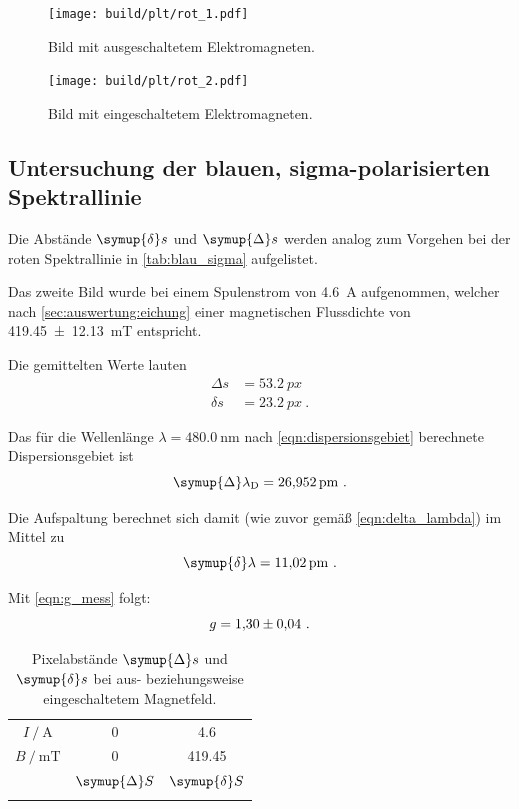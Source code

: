 \begin{figure}
    \centering
    \texttt{[image: build/plt/rot\_1.pdf]}
    \caption{Bild mit ausgeschaltetem Elektromagneten.}
    \label{fig:plt:rot_1}
\end{figure}

\begin{figure}
    \centering
    \texttt{[image: build/plt/rot\_2.pdf]}
    \caption{Bild mit eingeschaltetem Elektromagneten.}
    \label{fig:plt:rot_2}
\end{figure}


\FloatBarrier
\subsection{Untersuchung der blauen, sigma-polarisierten Spektrallinie}
Die Abstände $\symup{\delta} s$ und $\symup{\Delta} s$ werden analog zum Vorgehen bei der roten Spektrallinie
in \autoref{tab:blau_sigma} aufgelistet.

Das zweite Bild wurde bei einem Spulenstrom von \SI{4.6}{\ampere} aufgenommen,
welcher nach \autoref{sec:auswertung:eichung} einer magnetischen Flussdichte von \SI{419.45 \pm 12.13}{\milli\tesla} entspricht.

Die gemittelten Werte lauten
\begin{align*}
    Δs &= \SI{53.2}{px} \\
    δs &= \SI{23.2}{px} \ .
\end{align*}


Das für die Wellenlänge $\lambda = \SI{480.0}{\nano\meter}$ nach \autoref{eqn:dispersionsgebiet} berechnete Dispersionsgebiet ist
\[
    \symup{\Delta}\lambda_\text{D} = \SI{26.952}{\pico\meter} \ .
\]

Die Aufspaltung berechnet sich damit (wie zuvor gemäß \autoref{eqn:delta_lambda}) im Mittel zu
\[
    \symup{\delta} \lambda = \SI{11.02}{\pico\meter} \ .
\]

Mit \autoref{eqn:g_mess} folgt:
\[
    g = \num{1.30 \pm 0.04} \ .
\]

\begin{table}
    \centering
    \caption{Pixelabstände $\symup{\Delta} s$ und $\symup{\delta} s$ bei aus- beziehungsweise eingeschaltetem Magnetfeld.}
    \label{tab:blau_sigma}
    \begin{tabular}{S S S}
        \toprule
        {$I \mathbin{/} \si{\ampere}$} & 0 & 4.6 \\
        {$B \mathbin{/} \si{\milli\tesla}$} & 0 & 419.45  \\
        \midrule
        & {$\symup{\Delta} S$} & {$\symup{\delta} S$} \\
        \midrule
        \bottomrule
    \end{tabular}
\end{table}

